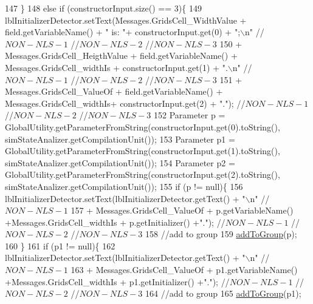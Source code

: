 \begin{DoxyCode}
147         \}
148         \textcolor{keywordflow}{else} \textcolor{keywordflow}{if} (constructorInput.size() == 3)\{
149             lblInitializerDetector.setText(Messages.GridsCell\_WidthValue + field.getVariableName() + \textcolor{stringliteral}{" is: 
      "}+ constructorInput.get(0) + \textcolor{stringliteral}{";\(\backslash\)n"} \textcolor{comment}{//$NON-NLS-1$ //$NON-NLS-2$ //$NON-NLS-3$}
150                     + Messages.GridsCell\_HeigthValue + field.getVariableName() + Messages.GridsCell\_widthIs
       + constructorInput.get(1) + \textcolor{stringliteral}{".\(\backslash\)n"} \textcolor{comment}{//$NON-NLS-1$ //$NON-NLS-2$ //$NON-NLS-3$}
151                     + Messages.GridsCell\_ValueOf + field.getVariableName() + Messages.GridsCell\_widthIs+ 
      constructorInput.get(2) + \textcolor{stringliteral}{"."}); \textcolor{comment}{//$NON-NLS-1$ //$NON-NLS-2$ //$NON-NLS-3$}
152             Parameter p = GlobalUtility.getParameterFromString(constructorInput.get(0).toString(), 
      simStateAnalizer.getCompilationUnit());
153             Parameter p1 = GlobalUtility.getParameterFromString(constructorInput.get(1).toString(), 
      simStateAnalizer.getCompilationUnit());
154             Parameter p2 = GlobalUtility.getParameterFromString(constructorInput.get(2).toString(), 
      simStateAnalizer.getCompilationUnit());
155             \textcolor{keywordflow}{if} (p != null)\{ 
156                 lblInitializerDetector.setText(lblInitializerDetector.getText() + \textcolor{stringliteral}{"\(\backslash\)n"} \textcolor{comment}{//$NON-NLS-1$}
157                     +  Messages.GridsCell\_ValueOf + p.getVariableName() +Messages.GridsCell\_widthIs + 
      p.getInitializer() +\textcolor{stringliteral}{"."}); \textcolor{comment}{//$NON-NLS-1$ //$NON-NLS-2$ //$NON-NLS-3$}
158                 \textcolor{comment}{//add to group}
159                 \hyperlink{classit_1_1isislab_1_1masonassisteddocumentation_1_1mason_1_1wizards_1_1_g___grids_cell_page_a874d5aab262342b54eb0bd9ea0e576ab}{addToGroup}(p);
160             \}
161             \textcolor{keywordflow}{if} (p1 != null)\{    
162                 lblInitializerDetector.setText(lblInitializerDetector.getText() + \textcolor{stringliteral}{"\(\backslash\)n"} \textcolor{comment}{//$NON-NLS-1$}
163                     +  Messages.GridsCell\_ValueOf + p1.getVariableName() +Messages.GridsCell\_widthIs + 
      p1.getInitializer() +\textcolor{stringliteral}{"."}); \textcolor{comment}{//$NON-NLS-1$ //$NON-NLS-2$ //$NON-NLS-3$}
164                 \textcolor{comment}{//add to group}
165                 \hyperlink{classit_1_1isislab_1_1masonassisteddocumentation_1_1mason_1_1wizards_1_1_g___grids_cell_page_a874d5aab262342b54eb0bd9ea0e576ab}{addToGroup}(p1);

\end{DoxyCode}

